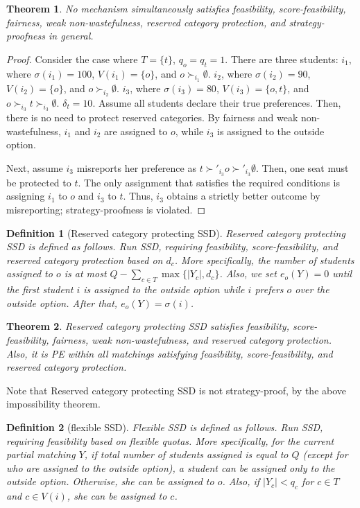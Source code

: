 \documentclass{article}
\newtheorem{theorem}{Theorem}
\newtheorem{definition}{Definition}
\begin{document}
\begin{theorem}
No mechanism 
simultaneously satisfies feasibility, score-feasibility, fairness, weak non-wastefulness, 
reserved category protection, and strategy-proofness in general. 
\end{theorem}
\begin{proof}
Consider the case where $T=\{t\}$, $q_o=q_t=1$. 
There are three students: $i_1$, where $\sigma(i_1)=100$, 
$V(i_1)=\{o\}$, and $o\succ_{i_1} \emptyset$.
$i_2$, where $\sigma(i_2)=90$, 
$V(i_2)=\{o\}$, and $o\succ_{i_2} \emptyset$.
$i_3$, where $\sigma(i_3)=80$, 
$V(i_3)=\{o, t\}$, and 
$o \succ_{i_3} t \succ_{i_3} \emptyset$. 
$\delta_t=10$. 
Assume all students declare their true preferences. 
Then, there is no need to protect reserved categories. By fairness and weak non-wastefulness, 
$i_1$ and $i_2$ are assigned to $o$, while $i_3$ is assigned to the outside option. 

Next, assume $i_3$ misreports her preference as 
$t \succ'_{i_3} o \succ'_{i_3} \emptyset$. 
Then, one seat must be protected to $t$. 
The only assignment that satisfies the required conditions is assigning $i_1$ to $o$ and 
$i_3$ to $t$. Thus, $i_3$ obtains a strictly better outcome by misreporting; strategy-proofness
is violated. 
\end{proof}

\begin{definition}[Reserved category protecting SSD]
Reserved category protecting SSD is defined as follows. 
Run SSD, requiring feasibility, score-feasibility, and reserved category protection based on 
$d_c$. More specifically, the number of students assigned to $o$ is at most
$Q-\sum_{c\in T}\max{\{|Y_c|, d_c\}}$. Also, we set $e_o(Y)=0$ until the first student $i$ is assigned 
to the outside option while $i$ prefers $o$ over the outside option. 
After that, $e_o(Y)=\sigma(i)$. 
\end{definition}

\begin{theorem}
Reserved category protecting SSD
satisfies feasibility, score-feasibility, fairness, weak non-wastefulness, 
and reserved category protection. Also, it is PE within all matchings satisfying 
feasibility, score-feasibility, and reserved category protection. 
\end{theorem}
Note that Reserved category protecting SSD is not strategy-proof, 
by the above impossibility theorem.

\begin{definition}[flexible SSD]
Flexible SSD is defined as follows. 
Run SSD, requiring feasibility based on flexible quotas.
More specifically, for the current partial matching $Y$, if 
total number of students assigned is equal to $Q$
(except for who are assigned to the outside option), a student can be assigned only to 
the outside option. 
Otherwise, she can be assigned to $o$. Also, if $|Y_c|<q_c$ for $c\in T$ and $c\in V(i)$, she can 
be assigned to $c$.
\end{definition}
\end{document}
